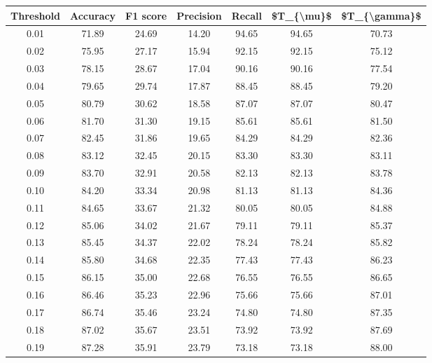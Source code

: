 \begin{tabular}{|c|c|c|c|c|c|c|}
\hline
 Threshold &  Accuracy &  F1 score &  Precision &  Recall &  \$T\_\{\textbackslash mu\}\$ &  \$T\_\{\textbackslash gamma\}\$ \\
\hline
      0.01 &     71.89 &     24.69 &      14.20 &   94.65 &      94.65 &         70.73 \\
      0.02 &     75.95 &     27.17 &      15.94 &   92.15 &      92.15 &         75.12 \\
      0.03 &     78.15 &     28.67 &      17.04 &   90.16 &      90.16 &         77.54 \\
      0.04 &     79.65 &     29.74 &      17.87 &   88.45 &      88.45 &         79.20 \\
      0.05 &     80.79 &     30.62 &      18.58 &   87.07 &      87.07 &         80.47 \\
      0.06 &     81.70 &     31.30 &      19.15 &   85.61 &      85.61 &         81.50 \\
      0.07 &     82.45 &     31.86 &      19.65 &   84.29 &      84.29 &         82.36 \\
      0.08 &     83.12 &     32.45 &      20.15 &   83.30 &      83.30 &         83.11 \\
      0.09 &     83.70 &     32.91 &      20.58 &   82.13 &      82.13 &         83.78 \\
      0.10 &     84.20 &     33.34 &      20.98 &   81.13 &      81.13 &         84.36 \\
      0.11 &     84.65 &     33.67 &      21.32 &   80.05 &      80.05 &         84.88 \\
      0.12 &     85.06 &     34.02 &      21.67 &   79.11 &      79.11 &         85.37 \\
      0.13 &     85.45 &     34.37 &      22.02 &   78.24 &      78.24 &         85.82 \\
      0.14 &     85.80 &     34.68 &      22.35 &   77.43 &      77.43 &         86.23 \\
      0.15 &     86.15 &     35.00 &      22.68 &   76.55 &      76.55 &         86.65 \\
      0.16 &     86.46 &     35.23 &      22.96 &   75.66 &      75.66 &         87.01 \\
      0.17 &     86.74 &     35.46 &      23.24 &   74.80 &      74.80 &         87.35 \\
      0.18 &     87.02 &     35.67 &      23.51 &   73.92 &      73.92 &         87.69 \\
      0.19 &     87.28 &     35.91 &      23.79 &   73.18 &      73.18 &         88.00 \\

\end{tabular}
